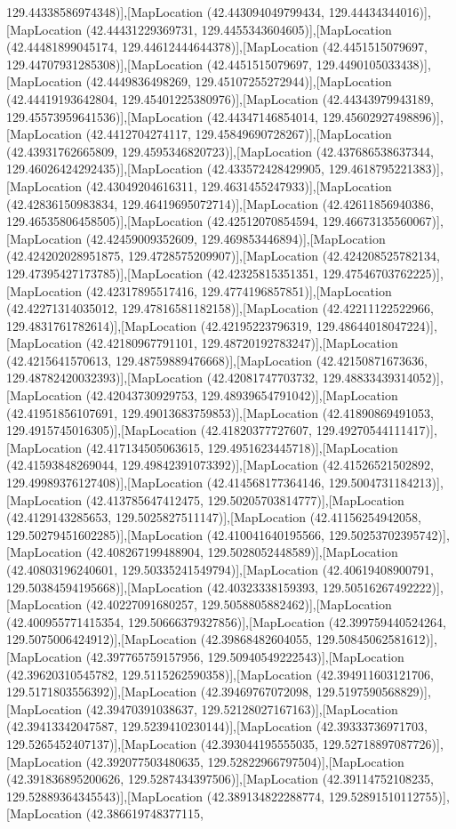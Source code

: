 129.44338586974348)],[MapLocation (42.443094049799434, 129.44434344016)],[MapLocation (42.44431229369731, 129.4455343604605)],[MapLocation (42.44481899045174, 129.44612444644378)],[MapLocation (42.4451515079697, 129.44707931285308)],[MapLocation (42.4451515079697, 129.4490105033438)],[MapLocation (42.4449836498269, 129.45107255272944)],[MapLocation (42.44419193642804, 129.45401225380976)],[MapLocation (42.44343979943189, 129.45573959641536)],[MapLocation (42.44347146854014, 129.45602927498896)],[MapLocation (42.4412704274117, 129.45849690728267)],[MapLocation (42.43931762665809, 129.4595346820723)],[MapLocation (42.437686538637344, 129.46026424292435)],[MapLocation (42.433572428429905, 129.4618795221383)],[MapLocation (42.43049204616311, 129.4631455247933)],[MapLocation (42.42836150983834, 129.46419695072714)],[MapLocation (42.42611856940386, 129.46535806458505)],[MapLocation (42.42512070854594, 129.46673135560067)],[MapLocation (42.42459009352609, 129.469853446894)],[MapLocation (42.424202028951875, 129.4728575209907)],[MapLocation (42.424208525782134, 129.47395427173785)],[MapLocation (42.42325815351351, 129.47546703762225)],[MapLocation (42.42317895517416, 129.4774196857851)],[MapLocation (42.42271314035012, 129.47816581182158)],[MapLocation (42.42211122522966, 129.4831761782614)],[MapLocation (42.42195223796319, 129.48644018047224)],[MapLocation (42.42180967791101, 129.48720192783247)],[MapLocation (42.4215641570613, 129.48759889476668)],[MapLocation (42.42150871673636, 129.48782420032393)],[MapLocation (42.42081747703732, 129.48833439314052)],[MapLocation (42.42043730929753, 129.48939654791042)],[MapLocation (42.41951856107691, 129.49013683759853)],[MapLocation (42.41890869491053, 129.4915745016305)],[MapLocation (42.41820377727607, 129.49270544111417)],[MapLocation (42.417134505063615, 129.4951623445718)],[MapLocation (42.41593848269044, 129.49842391073392)],[MapLocation (42.41526521502892, 129.49989376127408)],[MapLocation (42.414568177364146, 129.5004731184213)],[MapLocation (42.413785647412475, 129.50205703814777)],[MapLocation (42.4129143285653, 129.5025827511147)],[MapLocation (42.41156254942058, 129.50279451602285)],[MapLocation (42.410041640195566, 129.50253702395742)],[MapLocation (42.408267199488904, 129.5028052448589)],[MapLocation (42.40803196240601, 129.50335241549794)],[MapLocation (42.40619408900791, 129.50384594195668)],[MapLocation (42.40323338159393, 129.50516267492222)],[MapLocation (42.40227091680257, 129.5058805882462)],[MapLocation (42.400955771415354, 129.50666379327856)],[MapLocation (42.399759440524264, 129.5075006424912)],[MapLocation (42.39868482604055, 129.50845062581612)],[MapLocation (42.397765759157956, 129.50940549222543)],[MapLocation (42.39620310545782, 129.5115262590358)],[MapLocation (42.394911603121706, 129.5171803556392)],[MapLocation (42.39469767072098, 129.5197590568829)],[MapLocation (42.39470391038637, 129.52128027167163)],[MapLocation (42.39413342047587, 129.5239410230144)],[MapLocation (42.39333736971703, 129.5265452407137)],[MapLocation (42.393044195555035, 129.52718897087726)],[MapLocation (42.392077503480635, 129.52822966797504)],[MapLocation (42.391836895200626, 129.5287434397506)],[MapLocation (42.39114752108235, 129.52889364345543)],[MapLocation (42.389134822288774, 129.52891510112755)],[MapLocation (42.386619748377115, 